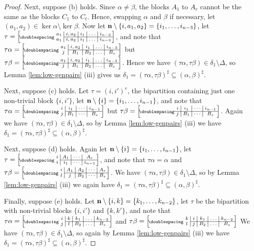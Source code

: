 \begin{lemma}
\begin{proof}
    Next, suppose (b) holds.
    Since $\alpha \neq \beta$, the blocks $A_1$ to $A_r$ cannot be the same as
    the blocks $C_1$ to $C_t$.  Hence, swapping $\alpha$ and $\beta$ if
    necessary, let $(a_1,a_2) \in \ker\alpha \setminus \ker\beta$.  Now let
    $\mathbf{n} \setminus \{i,a_1,a_2\} = \{i_1, \ldots, i_{n-3}\}$, let
    $\tau=\bipart{c|c|c|c|c}{2-5}
    {a_1 & i,a_2 & i_1 & \ldots & i_{n-3}}
    {a_1 & i,a_2 & i_1 & \ldots & i_{n-3}}$,
    and note that
    $\tau\alpha = \bipart{c|c|c|c|c}{2-5}
    {a_1 & i,a_2 & i_1 & \ldots & i_{n-3}}{j & B_1 & B_2 & \ldots & B_s}$ but
    $\tau\beta = \bipart{c|c|c|c|c}{1-5}
    {a_1 & i,a_2 & i_1 & \ldots & i_{n-3}}{j & B_1 & B_2 & \ldots & B_s}$.
    Hence we have $(\tau\alpha,\tau\beta) \in \delta_1 \setminus \Delta$, so
    Lemma \ref{lem:low-genpairs} (iii) gives us
    $\delta_1 = (\tau\alpha,\tau\beta)^\sharp \subseteq (\alpha,\beta)^\sharp$.

    Next, suppose (c) holds.  Let $\tau = (i,i')^e$, the
    bipartition containing just one non-trivial block $\{i,i'\}$, let
    $\mathbf{n} \setminus \{i\}=\{i_1,\ldots,i_{n-1}\}$, and note that
    $\tau\alpha = \bipart{c|c|c|c}{2-4}
    {i & i_1 & \cdots & i_{n-1}}{j & B_1 & \cdots & B_s}$ but
    $\tau\beta = \bipart{c|c|c|c}{1-4}
    {i & i_1 & \cdots & i_{n-1}}{j & B_1 & \cdots & B_s}$.
    Again we have $(\tau\alpha,\tau\beta) \in \delta_1 \setminus \Delta$, so by
    Lemma \ref{lem:low-genpairs} (iii) we have
    $\delta_1 = (\tau\alpha,\tau\beta)^\sharp \subseteq (\alpha,\beta)^\sharp$.

    Next, suppose (d) holds.
    Again let $\mathbf{n}\setminus\{i\}=\{i_1,\ldots,i_{n-1}\}$, let
    $\tau=\bipart{c|c|c|c}{2-4}
    {i & A_1 & \cdots & A_r}{i & i_1 & \cdots & i_{n-1}}$, and note that
    $\tau\alpha = \alpha $ and
    $\tau\beta = \bipart{c|c|c|c|c}{2-5}
    {i & A_1 & A_2 & \cdots & A_r}{l & j & B_2 & \cdots & B_s}$.
    We have $(\tau\alpha,\tau\beta) \in \delta_1 \setminus \Delta$, so by
    Lemma \ref{lem:low-genpairs} (iii) we again have
    $\delta_1=(\tau\alpha, \tau\beta)^\sharp\subseteq(\alpha,\beta)^\sharp$.

    Finally, suppose (e) holds.
    Let $\mathbf{n}\setminus\{i,k\}=\{k_1,\ldots,k_{n-2}\}$, let
    $\tau$ be the bipartition with non-trivial blocks $\{i,i'\}$ and $\{k,k'\}$,
    and note that
    $\tau\alpha=\bipart{c|c|c|c|c}{2-5}
    {i & k & k_1 & \ldots & k_{n-2}}
    {j & l & B_2 & \ldots & B_s}$
    and
    $\tau\beta=\bipart{c|c|c|c|c}{2-5}
    {k & i & k_1 & \ldots & k_{n-2}}
    {l & j & B_2 & \ldots & B_s}$
    We have $(\tau\alpha,\tau\beta) \in \delta_1 \setminus \Delta$, so again by
    Lemma \ref{lem:low-genpairs} (iii) we have
    $\delta_1 = (\tau\alpha, \tau\beta)^\sharp \subseteq (\alpha,\beta)^\sharp$.


\end{proof}
\end{lemma}
